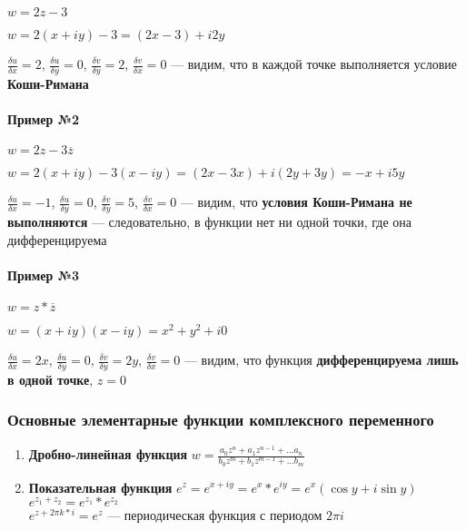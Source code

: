 \documentclass{article}
\begin{document}
$w = 2 z - 3$

$w = 2 (x + i y) - 3 = (2 x - 3) + i 2 y$

$\frac{\delta u}{\delta x} = 2$, $\frac{\delta u}{\delta y} = 0$, $\frac{\delta v}{\delta y} = 2$, $\frac{\delta v}{\delta x} = 0$ — видим, что в каждой точке выполняется условие \textbf{Коши-Римана}

\paragraph{Пример №2}

$w = 2 z - 3 \overline{z}$

$w = 2 (x + i y) - 3 (x - i y) = (2 x - 3 x) + i (2y + 3 y) = -x + i 5 y$

$\frac{\delta u}{\delta x} = -1$, $\frac{\delta u}{\delta y} = 0$, $\frac{\delta v}{\delta y} = 5$, $\frac{\delta v}{\delta x} = 0$ — видим, что \textbf{условия Коши-Римана не выполняются} — следовательно, в функции нет ни одной точки, где она дифференцируема

\paragraph{Пример №3}

$w = z * \overline{z}$

$w = (x + iy) (x - iy) = x^2 + y^2 + i 0$

$\frac{\delta u}{\delta x} = 2 x$, $\frac{\delta u}{\delta y} = 0$, $\frac{\delta v}{\delta y} = 2 y$, $\frac{\delta v}{\delta x} = 0$ — видим, что функция \textbf{дифференцируема лишь в одной точке}, $z = 0$

\subsubsection{Основные элементарные функции комплексного переменного}

\begin{enumerate}
    \item \textbf{Дробно-линейная функция} $w = \frac{a_0 z^{n} + a_1 z^{n - 1} + \dots a_{n}}{b_0 z^{m} + b_1 z^{m - 1} + \dots b_{m}}$
    \item \textbf{Показательная функция} $e^{z} = e^{x + i y} = e^{x} * e^{i y} = e^{x} (\cos y + i \sin y)$ \\
    $e^{z_1 + z_2} = e^{z_1} * e^{z_2}$ \\
    $e^{z + 2 \pi k * i} = e^{z}$ — периодическая функция с периодом $2 \pi i$
\end{enumerate}
\end{document}
